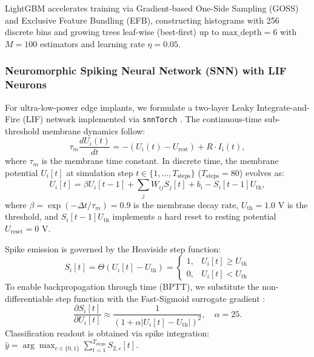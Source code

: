 \documentclass[pdflatex,sn-mathphys-num]{sn-jnl}
\begin{document}
LightGBM accelerates training via Gradient-based One-Side Sampling (GOSS) and Exclusive Feature Bundling (EFB), constructing histograms with 256 discrete bins and growing trees leaf-wise (best-first) up to $\text{max\_depth} = 6$ with $M = 100$ estimators and learning rate $\eta = 0.05$.

\subsubsection{Neuromorphic Spiking Neural Network (SNN) with LIF Neurons}
For ultra-low-power edge implants, we formulate a two-layer Leaky Integrate-and-Fire (LIF) network implemented via \texttt{snnTorch} \cite{eshraghian2023training,gerstner2014neuronal}. The continuous-time sub-threshold membrane dynamics follow:
\begin{equation}
\tau_m \frac{d U_i(t)}{dt} = -(U_i(t) - U_{\text{rest}}) + R \cdot I_i(t),
\label{eq:lif_cont}
\end{equation}
where $\tau_m$ is the membrane time constant. In discrete time, the membrane potential $U_i[t]$ at simulation step $t \in \{1, \dots, T_{\text{steps}}\}$ ($T_{\text{steps}} = 80$) evolves as:
\begin{equation}
U_i[t] = \beta U_i[t-1] + \sum_{j} W_{ij} S_j[t] + b_i - S_i[t-1] U_{\text{th}},
\label{eq:lif_discrete}
\end{equation}
where $\beta = \exp(-\Delta t / \tau_m) = 0.9$ is the membrane decay rate, $U_{\text{th}} = 1.0\text{ V}$ is the threshold, and $S_i[t-1] U_{\text{th}}$ implements a hard reset to resting potential $U_{\text{reset}} = 0\text{ V}$.

Spike emission is governed by the Heaviside step function:
\begin{equation}
S_i[t] = \Theta(U_i[t] - U_{\text{th}}) = \begin{cases} 1, & U_i[t] \ge U_{\text{th}} \\ 0, & U_i[t] < U_{\text{th}} \end{cases}
\label{eq:lif_fire}
\end{equation}
To enable backpropagation through time (BPTT), we substitute the non-differentiable step function with the Fast-Sigmoid surrogate gradient \cite{eshraghian2023training}:
\begin{equation}
\frac{\partial S_i[t]}{\partial U_i[t]} \approx \frac{1}{\left( 1 + \alpha |U_i[t] - U_{\text{th}}| \right)^2}, \quad \alpha = 25.
\label{eq:surrogate}
\end{equation}
Classification readout is obtained via spike integration: $\hat{y} = \arg\max_{c \in \{0, 1\}} \sum_{t=1}^{T_{\text{steps}}} S_{2, c}[t]$.
\end{document}
